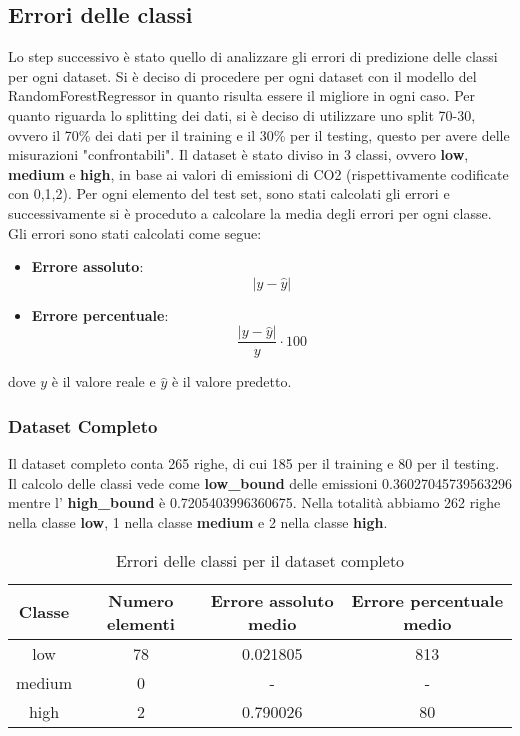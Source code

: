 \subsection{Errori delle classi}

Lo step successivo è stato quello di analizzare gli errori di predizione delle classi per ogni dataset.
Si è deciso di procedere per ogni dataset con il modello del RandomForestRegressor in quanto risulta essere il migliore in ogni caso.
Per quanto riguarda lo splitting dei dati, si è deciso di utilizzare uno split 70-30, ovvero il 70\% dei dati per il training e il 30\% per il testing, questo per avere delle misurazioni "confrontabili".
Il dataset è stato diviso in 3 classi, ovvero \textbf{low}, \textbf{medium} e \textbf{high}, in base ai valori di emissioni di CO2 (rispettivamente codificate con 0,1,2).
Per ogni elemento del test set, sono stati calcolati gli errori e successivamente si è proceduto a calcolare la media degli errori per ogni classe.
Gli errori sono stati calcolati come segue:
\begin{itemize}
    \item \textbf{Errore assoluto}:\begin{equation*}
        |y - \hat{y}|
         \end{equation*}
    \item \textbf{Errore percentuale}: \begin{equation*}
        \frac{|y - \hat{y}|}{y} \cdot 100
    \end{equation*}
\end{itemize}
dove $y$ è il valore reale e $\hat{y}$ è il valore predetto.


\subsubsection{Dataset Completo}

Il dataset completo conta 265 righe, di cui 185 per il training e 80 per il testing.
Il calcolo delle classi vede come \textbf{low\_bound} delle emissioni 0.36027045739563296 mentre l' \textbf{high\_bound} è 0.7205403996360675.
Nella totalità abbiamo 262 righe nella classe \textbf{low}, 1 nella classe \textbf{medium} e 2 nella classe \textbf{high}.


\begin{table}[H]
    \centering
    \begin{tabular}{|c|c|c|c|}
        \hline
        \textbf{Classe} &  \textbf{Numero elementi} & \textbf{Errore assoluto medio} & \textbf{Errore percentuale medio} \\ \hline
        low             & 78                & 0.021805                   & 813            \\ \hline
        medium          & 0                & -                  & -            \\ \hline
        high            & 2                & 0.790026                   & 80            \\ \hline
    \end{tabular}
    \caption{Errori delle classi per il dataset completo}
\end{table}



